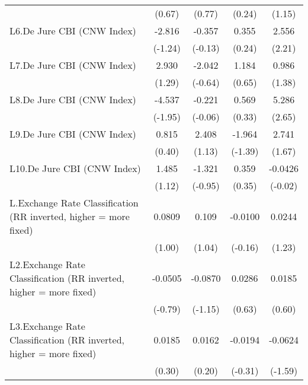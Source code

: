 {\begin{longtable}{l*{4}{c}}
                &   (0.67)         &   (0.77)         &   (0.24)         &   (1.15)         \\
\addlinespace
L6.De Jure CBI (CNW Index)&   -2.816         &   -0.357         &    0.355         &    2.556\sym{*}  \\
                &  (-1.24)         &  (-0.13)         &   (0.24)         &   (2.21)         \\
\addlinespace
L7.De Jure CBI (CNW Index)&    2.930         &   -2.042         &    1.184         &    0.986         \\
                &   (1.29)         &  (-0.64)         &   (0.65)         &   (1.38)         \\
\addlinespace
L8.De Jure CBI (CNW Index)&   -4.537         &   -0.221         &    0.569         &    5.286\sym{**} \\
                &  (-1.95)         &  (-0.06)         &   (0.33)         &   (2.65)         \\
\addlinespace
L9.De Jure CBI (CNW Index)&    0.815         &    2.408         &   -1.964         &    2.741         \\
                &   (0.40)         &   (1.13)         &  (-1.39)         &   (1.67)         \\
\addlinespace
L10.De Jure CBI (CNW Index)&    1.485         &   -1.321         &    0.359         &  -0.0426         \\
                &   (1.12)         &  (-0.95)         &   (0.35)         &  (-0.02)         \\
\addlinespace
L.Exchange Rate Classification (RR inverted, higher = more fixed)&   0.0809         &    0.109         &  -0.0100         &   0.0244         \\
                &   (1.00)         &   (1.04)         &  (-0.16)         &   (1.23)         \\
\addlinespace
L2.Exchange Rate Classification (RR inverted, higher = more fixed)&  -0.0505         &  -0.0870         &   0.0286         &   0.0185         \\
                &  (-0.79)         &  (-1.15)         &   (0.63)         &   (0.60)         \\
\addlinespace
L3.Exchange Rate Classification (RR inverted, higher = more fixed)&   0.0185         &   0.0162         &  -0.0194         &  -0.0624         \\
                &   (0.30)         &   (0.20)         &  (-0.31)         &  (-1.59)         \\

\end{longtable}}

